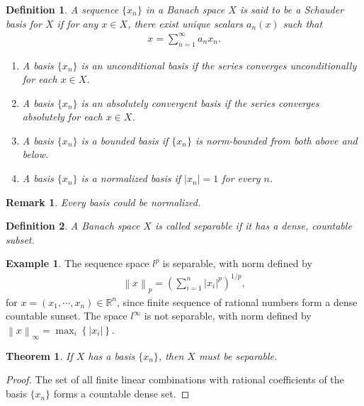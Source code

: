 \documentclass[10pt]{book}
\newtheorem{definition}{Definition}[chapter]
\newtheorem{theorem}{Theorem}[chapter]
\newtheorem{remark}{Remark}[chapter]
\theoremstyle{definition}
\newtheorem{example}{Example}[chapter]
\numberwithin{equation}{chapter}
\begin{document}
\begin{definition}
A sequence $\{x_n\}$ in a Banach space $X$ is said to be a Schauder basis for $X$ if for any $x \in X$, there exist unique scalars $a_n(x)$ such that
\begin{align*}
    x = \sum^\infty_{n = 1} a_n x_n.
\end{align*}
\begin{enumerate}[label=(\alph*)]
    \item A basis $\{x_n\}$ is an unconditional basis if the series converges unconditionally for each $x \in X$.
    
    \item A basis $\{x_n\}$ is an absolutely convergent basis if the series converges absolutely for each $x \in X$.
    
    \item A basis $\{x_n\}$ is a bounded basis if $\{x_n\}$ is norm-bounded from both above and below.
    
    \item A basis $\{x_n\}$ is a normalized basis if $\left|x_n\right| = 1$ for every $n$.
\end{enumerate}
\end{definition}

\begin{remark}
Every basis could be normalized.
\end{remark}

\begin{definition}
A Banach space $X$ is called separable if it has a dense, countable subset.
\end{definition}

\medskip

\begin{example}
The sequence space $l^p$ is separable, with norm defined by
\begin{align*}
    \left\|x\right\|_p = \left(\sum^n_{i=1} \left|x_i\right|^p\right)^{1/p},
\end{align*}
for $x = (x_1, \cdots, x_n) \in \mathbb{R}^n$, since finite sequence of rational numbers form a dense countable sunset. The space $l^\infty$ is not separable, with norm defined by $\left\|x\right\|_\infty = \max_i \left\{\left|x_i\right|\right\}$.
\end{example}

\medskip

\begin{theorem}
If $X$ has a basis $\{x_n\}$, then $X$ must be separable.
\end{theorem}
\begin{proof}
The set of all finite linear combinations with rational coefficients of the basis $\{x_n\}$ forms a countable dense set.
\end{proof}
\end{document}
